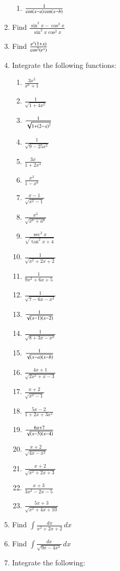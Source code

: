 \begin{enumerate}[label=\arabic*.,ref=\thesubsection.\theenumi]
\begin{enumerate}[label = (\roman*)]
\item $\frac{1}{\cos\left(x-a\right)\cos\left(x-b\right)}$
%
\end{enumerate}
%
\item Find  
$
\frac{\sin^2 x -\cos^2 x}{\sin^2x \cos^2 x}
$
%
\item Find  
$
\frac{e^{x}\left(1+x\right)}{\cos^2 \left(e^x\right)}
$
\item Integrate the following functions:
%
\begin{enumerate}[label = (\roman*)]
\item $\frac{3 x^2}{x^6+1}$
\item $\frac{1}{\sqrt{1+ 4x^2}}$
\item $\frac{1}{\sqrt{1+ \left(2-x\right)^2}}$
\item $\frac{1}{\sqrt{9-25x^2}}$
\item $\frac{3x}{1+2x^4}$
\item $\frac{x^2}{1-x^6}$
\item $\frac{x-1}{\sqrt{x^2-1}}$
\item $\frac{x^2}{\sqrt{x^6+a^6}}$
\item $\frac{\sec^2 x}{\sqrt{\tan^2x +4 }}$
\item $\frac{1}{\sqrt{x^2+2x+2 }}$
\item $\frac{1}{9x^2+6x+5 }$
\item $\frac{1}{\sqrt{7-6x-x^2}}$
\item $\frac{1}{\sqrt{\left(x-1\right)\left(x-2\right)}}$
\item $\frac{1}{\sqrt{8+3x-x^2}}$
\item $\frac{1}{\sqrt{\left(x-a\right)\left(x-b\right)}}$
\item $\frac{4x+1}{\sqrt{2x^2+x-3}}$
\item $\frac{x+2}{\sqrt{x^2-1}}$
\item $\frac{5x-2}{1+2x+3x^2}$
\item $\frac{6x+7}{\sqrt{\left(x-5\right)\left(x-4\right)}}$
\item $\frac{x+2}{\sqrt{4x-x^2}}$
\item $\frac{x+2}{\sqrt{x^2+2x+3}}$
\item $\frac{x+3}{3x^2-2x-5}$
\item $\frac{5x+3}{\sqrt{x^2+4x+10}}$
\end{enumerate}
%
\item Find 
%
$
\int \frac{dx}{x^2+2x+2}\, dx
$
%
\item Find 
%
$
\int \frac{dx}{\sqrt{9x-4x^2}}\, dx
$
%
\item Integrate the following:
\begin{enumerate}[label = (\roman*)]

\end{enumerate}
\end{enumerate}
